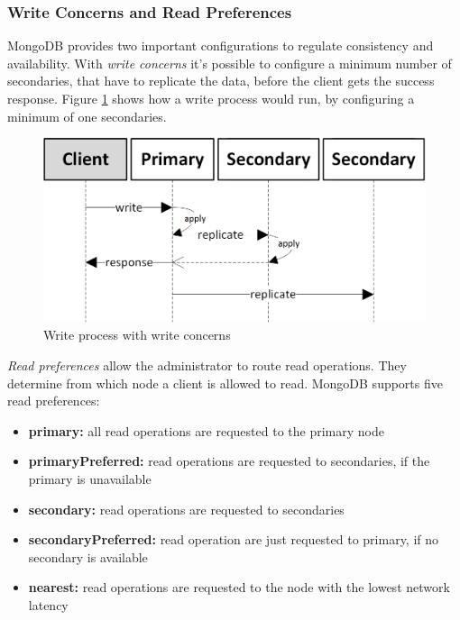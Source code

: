\subsubsection{Write Concerns and Read Preferences}\label{read-write}
MongoDB provides two important configurations to regulate consistency and availability. With \textit{write concerns} it's possible to configure a minimum number of secondaries, that have to replicate the data, before the client gets the success response. Figure \ref{write-concerns} shows how a write process would run, by configuring a minimum of one secondaries.
\begin{figure}[H]
\includegraphics[width=\linewidth,keepaspectratio]{images/write-concern.png}
\caption{Write process with write concerns}
\label{write-concerns}
\end{figure}
\textit{Read preferences} allow the administrator to route read operations. They determine from which node a client is allowed to read. MongoDB supports five read preferences:
\begin{itemize}
  \item \textbf{primary:} all read operations are requested to the primary node
  \item \textbf{primaryPreferred:} read operations are requested to secondaries, if the primary is unavailable
  \item \textbf{secondary:} read operations are requested to secondaries
  \item \textbf{secondaryPreferred:} read operation are just requested to primary, if no secondary is available
  \item \textbf{nearest:} read operations are requested to the node with the lowest network latency
\end{itemize}
\cite{mdbdocu}
